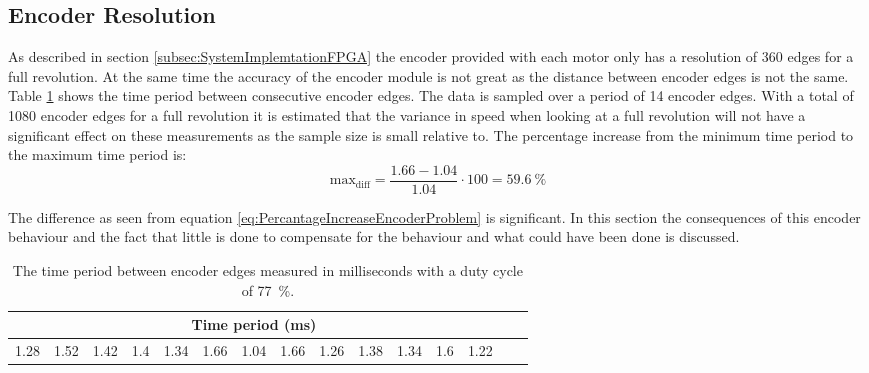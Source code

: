 \documentclass[../../main.tex]{subfiles}
\begin{document}



\subsection*{Encoder Resolution}
As described in section \ref{subsec:SystemImplemtationFPGA} the encoder provided with each motor only has a resolution of 360 edges for a full revolution. At the same time the accuracy of the encoder module is not great as the distance between encoder edges is not the same. Table \ref{tab:EncoderDifferenceBetweenEdges} shows the time period between consecutive encoder edges. The data is sampled over a period of 14 encoder edges. With a total of 1080 encoder edges for a full revolution it is estimated that the variance in speed when looking at a full revolution will not have a significant effect on these measurements as the sample size is small relative to. The percentage increase from the minimum time period to the maximum time period is:
\begin{equation} \label{eq:PercantageIncreaseEncoderProblem}
    \mathrm{max_{diff}} = \frac{1.66 - 1.04}{1.04} \cdot 100 = \SI{59.6}{\percent} 
\end{equation}

The difference as seen from equation \ref{eq:PercantageIncreaseEncoderProblem} is significant. In this section the consequences of this encoder behaviour and the fact that little is done to compensate for the behaviour and what could have been done is discussed.

\begin{table}[H]
    \centering
    \begin{tabular}{c c c c c c c c c c c c c c c}
         \multicolumn{13}{c}{Time period (ms)} \\ \hline
         
         1.28 &
         1.52 &
         1.42 &
         1.4  &
         1.34 &
         1.66 &
         1.04 &
         1.66 &
         1.26 &
         1.38 &
         1.34 &
         1.6  &
         1.22 
       
    \end{tabular}
    \caption{The time period between encoder edges measured in milliseconds with a duty cycle of \SI{77}{\percent}.}
    \label{tab:EncoderDifferenceBetweenEdges}
\end{table}
\end{document}

